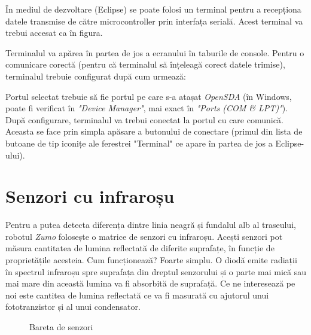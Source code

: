 În mediul de dezvoltare (Eclipse) se poate folosi un terminal pentru a recepționa datele transmise de către microcontroller prin interfața serială. Acest terminal va trebui accesat ca în figura.

Terminalul va apărea în partea de jos a ecranului în taburile de console. Pentru o comunicare corectă (pentru că terminalul să înțeleagă corect datele trimise), terminalul trebuie configurat după cum urmează:

Portul selectat trebuie să fie portul pe care s-a atașat \textit{OpenSDA} (în Windows, poate fi verificat în \textit{"Device Manager"}, mai exact în \textit{"Ports (COM \& LPT)"}). După configurare, terminalul va trebui conectat la portul cu care comunică. Aceasta se face prin simpla apăsare a butonului de conectare (primul din lista de butoane de tip iconițe ale ferestrei "Terminal" ce apare în partea de jos a Eclipse-ului).

\section{Senzori cu infraroșu}

Pentru a putea detecta diferența dintre linia neagră și fundalul alb al traseului, robotul \textit{Zumo} folosește o matrice de senzori cu infraroșu. Acești senzori pot măsura cantitatea de lumina reflectată de diferite suprafațe, în funcție de proprietățile acesteia. Cum funcționează? Foarte simplu. O diodă emite radiații în spectrul infraroșu spre suprafața din dreptul senzorului și o parte mai mică sau mai mare din această lumina va fi absorbită de suprafață. Ce ne interesează pe noi este cantitea de lumina reflectată ce va fi masurată cu ajutorul unui fototranzistor și al unui condensator.

\begin{figure}
    \vspace{-20pt}
    \vspace{-15pt}
    \caption{\label{fig:CodeWarrior-InfraredSensors} Bareta de senzori}
    \vspace{-20pt}
\end{figure}

